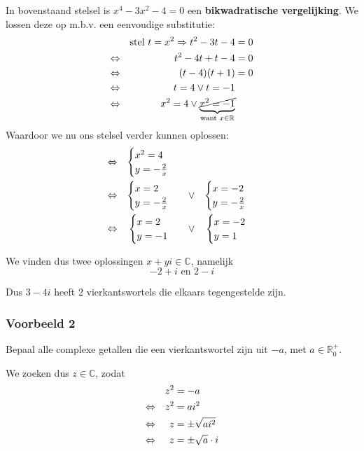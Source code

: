 \documentclass[12pt,twoside,a4paper]{article}
\begin{document}
In bovenstaand stelsel is $x^4-3x^2-4=0$ een {\bf bikwadratische vergelijking}. We lossen deze op m.b.v. een eenvoudige substitutie:
\begin{align*}
  &&\mbox{stel } t=x^2
  \Rightarrow t^2-3t-4&=0\\
  \Leftrightarrow && t^2-4t+t-4 &= 0\\
  \Leftrightarrow && (t-4)(t+1) &= 0\\
  \Leftrightarrow && t=4 \vee t=-1\\
  \Leftrightarrow && x^2=4 \vee \underbrace{\cancel{x^2=-1}}_{\text{want }x\in\mathbb{R}}
\end{align*}
Waardoor we nu ons stelsel verder kunnen oplossen:
\begin{align*}
  \Leftrightarrow && \begin{cases}x^2=4\\y=-\frac{2}{x}\end{cases}\\
  \Leftrightarrow && \begin{cases}x=2\\y=-\frac{2}{x}\end{cases} &&\vee&& \begin{cases}x=-2\\y=-\frac{2}{x}\end{cases}\\
  \Leftrightarrow && \begin{cases}x=2\\y=-1\end{cases} &&\vee&& \begin{cases}x=-2\\y=1\end{cases}
\end{align*}

We vinden dus twee oplossingen $x+yi\in\mathbb{C}$, namelijk
$$-2+i \mbox{ en } 2-i$$

Dus $3-4i$ heeft 2 vierkantswortels die elkaars tegengestelde zijn.

\subsubsection*{Voorbeeld 2}

Bepaal alle complexe getallen die een vierkantswortel zijn uit $-a$, met $a\in\mathbb{R}^+_0$.

We zoeken dus $z \in \mathbb{C}$, zodat
\begin{align*}
              && z^2 &= -a\\
         \Leftrightarrow && z^2 &= ai^2\\
         \Leftrightarrow && z   &= \pm \sqrt{ai^2}\\
         \Leftrightarrow && z   &= \pm \sqrt{a}\cdot i
\end{align*}
\end{document}
